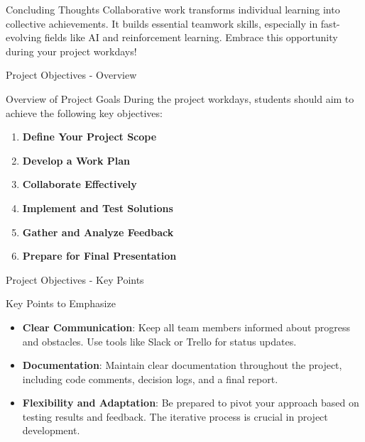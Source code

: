 \documentclass[aspectratio=169]{beamer}
\begin{document}
\begin{frame}[fragile]{Concluding Thoughts}
    Collaborative work transforms individual learning into collective achievements. 
    It builds essential teamwork skills, especially in fast-evolving fields like AI and reinforcement learning. 
    Embrace this opportunity during your project workdays!
\end{frame}

\begin{frame}[fragile]{Project Objectives - Overview}
    \begin{block}{Overview of Project Goals}
        During the project workdays, students should aim to achieve the following key objectives:
    \end{block}
    \begin{enumerate}
        \item \textbf{Define Your Project Scope}
        \item \textbf{Develop a Work Plan}
        \item \textbf{Collaborate Effectively}
        \item \textbf{Implement and Test Solutions}
        \item \textbf{Gather and Analyze Feedback}
        \item \textbf{Prepare for Final Presentation}
    \end{enumerate}
\end{frame}

\begin{frame}[fragile]{Project Objectives - Key Points}
    \begin{block}{Key Points to Emphasize}
        \begin{itemize}
            \item \textbf{Clear Communication}: Keep all team members informed about progress and obstacles. Use tools like Slack or Trello for status updates.
            \item \textbf{Documentation}: Maintain clear documentation throughout the project, including code comments, decision logs, and a final report.
            \item \textbf{Flexibility and Adaptation}: Be prepared to pivot your approach based on testing results and feedback. The iterative process is crucial in project development.
        \end{itemize}
    \end{block}
\end{frame}
\end{document}

